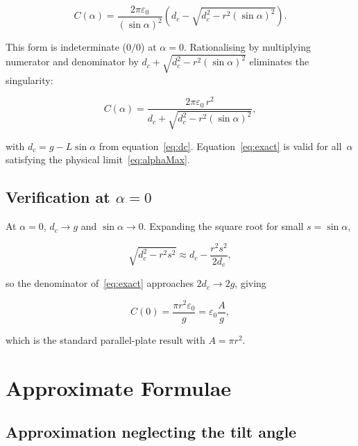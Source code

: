 \documentclass[11pt,a4paper]{article}
\begin{document}
\begin{equation}
  C(\alpha) = \frac{2\pi\varepsilon_0}{(\sin\alpha)^2}
              \!\left(d_c - \sqrt{d_c^2 - r^2(\sin\alpha)^2}\right).
  \label{eq:exactRaw}
\end{equation}

This form is indeterminate ($0/0$) at $\alpha = 0$.  Rationalising by
multiplying numerator and denominator by
$d_c + \sqrt{d_c^2 - r^2(\sin\alpha)^2}$ eliminates the singularity:

\begin{equation}
  \boxed{C(\alpha) = \frac{2\pi\varepsilon_0\, r^2}
         {d_c + \sqrt{d_c^2 - r^2(\sin\alpha)^2}},}
  \label{eq:exact}
\end{equation}

with $d_c = g - L\sin\alpha$ from equation~\eqref{eq:dc}.
Equation~\eqref{eq:exact} is valid for all~$\alpha$ satisfying the
physical limit~\eqref{eq:alphaMax}.

\subsection{Verification at \texorpdfstring{$\alpha = 0$}{alpha = 0}}

At $\alpha = 0$, $d_c \to g$ and $\sin\alpha \to 0$.  Expanding the
square root for small $s = \sin\alpha$,

\begin{equation}
  \sqrt{d_c^2 - r^2 s^2} \approx d_c - \frac{r^2 s^2}{2 d_c},
\end{equation}

so the denominator of~\eqref{eq:exact} approaches $2d_c \to 2g$, giving

\begin{equation}
  C(0) = \frac{\pi r^2 \varepsilon_0}{g} = \varepsilon_0 \frac{A}{g},
  \label{eq:C0}
\end{equation}

which is the standard parallel-plate result with $A = \pi r^2$. \checkmark

\section{Approximate Formulae}

\subsection{Approximation neglecting the tilt angle}
\end{document}
